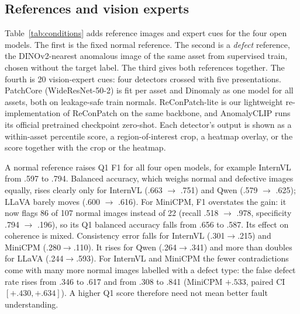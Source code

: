 \documentclass[11pt]{article}
\begin{document}
\subsection{References and vision experts}
Table~\ref{tab:conditions} adds reference images and expert cues for the four open models. The first is the fixed normal reference. The second is a \emph{defect} reference, the DINOv2-nearest anomalous image of the same asset from supervised train, chosen without the target label. The third gives both references together. The fourth is 20 vision-expert cues: four detectors crossed with five presentations. PatchCore (WideResNet-50-2) is fit per asset and Dinomaly as one model for all assets, both on leakage-safe train normals. ReConPatch-lite is our lightweight re-implementation of ReConPatch on the same backbone, and AnomalyCLIP runs its official pretrained checkpoint zero-shot. Each detector's output is shown as a within-asset percentile score, a region-of-interest crop, a heatmap overlay, or the score together with the crop or the heatmap.

A normal reference raises Q1 F1 for all four open models, for example InternVL from .597 to .794. Balanced accuracy, which weighs normal and defective images equally, rises clearly only for InternVL (.663 $\rightarrow$ .751) and Qwen (.579 $\rightarrow$ .625); LLaVA barely moves (.600 $\rightarrow$ .616). For MiniCPM, F1 overstates the gain: it now flags 86 of 107 normal images instead of 22 (recall .518 $\rightarrow$ .978, specificity .794 $\rightarrow$ .196), so its Q1 balanced accuracy falls from .656 to .587. Its effect on coherence is mixed. Consistency error falls for InternVL (.301$\rightarrow$.215) and MiniCPM (.280$\rightarrow$.110). It rises for Qwen (.264$\rightarrow$.341) and more than doubles for LLaVA (.244$\rightarrow$.593). For InternVL and MiniCPM the fewer contradictions come with many more normal images labelled with a defect type: the false defect rate rises from .346 to .617 and from .308 to .841 (MiniCPM $+.533$, paired CI $[+.430,+.634]$). A higher Q1 score therefore need not mean better fault understanding.
\end{document}
